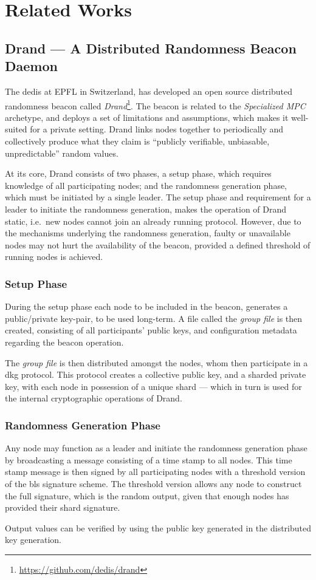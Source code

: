 \section{Related Works}

\subsection{Drand --- A Distributed Randomness Beacon Daemon}%
\label{sub:drand_a_distributed_randomness_beacon_daemon}
The \gls{dedis} at EPFL in Switzerland, has developed an open source distributed randomness beacon called \textit{Drand}\footnote{\url{https://github.com/dedis/drand}}.
The beacon is related to the \textit{Specialized MPC} archetype, and deploys a set of limitations and assumptions, which makes it well-suited for a private setting.
Drand links nodes together to periodically and collectively produce what they claim is \enquote{publicly verifiable, unbiasable, unpredictable} random values.

At its core, Drand consists of two phases, a setup phase, which requires knowledge of all participating nodes; and the randomness generation phase, which must be initiated by a single leader.
The setup phase and requirement for a leader to initiate the randomness generation, makes the operation of Drand static, i.e.\ new nodes cannot join an already running protocol.
However, due to the mechanisms underlying the randomness generation, faulty or unavailable nodes may not hurt the availability of the beacon, provided a defined threshold of running nodes is achieved.

\subsubsection{Setup Phase}
During the setup phase each node to be included in the beacon, generates a public/private key-pair, to be used long-term.
A file called the \textit{group file} is then created, consisting of all participants' public keys, and configuration metadata regarding the beacon operation.

The \textit{group file} is then distributed amongst the nodes, whom then participate in a \gls{dkg} protocol.
This protocol creates a collective public key, and a sharded private key, with each node in possession of a unique shard --- which in turn is used for the internal cryptographic operations of Drand.

\subsubsection{Randomness Generation Phase}
Any node may function as a leader and initiate the randomness generation phase by broadcasting a message consisting of a time stamp to all nodes.
This time stamp message is then signed by all participating nodes with a threshold version of the \gls{bls} signature scheme.
The threshold version allows any node to construct the full signature, which is the random output, given that enough nodes has provided their shard signature.

Output values can be verified by using the public key generated in the distributed key generation.
